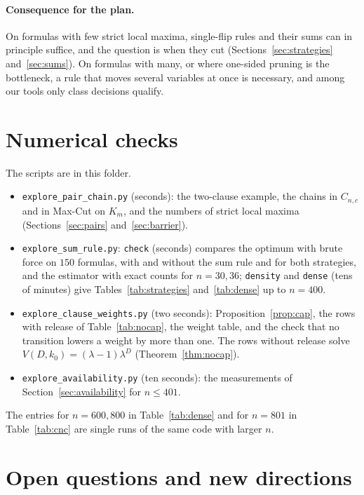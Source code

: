 \documentclass[11pt,a4paper]{article}
\theoremstyle{remark}
\begin{document}
\paragraph{Consequence for the plan.} On formulas with few strict local maxima,
single-flip rules and their sums can in principle suffice, and the question is
when they cut (Sections~\ref{sec:strategies} and~\ref{sec:sums}). On formulas
with many, or where one-sided pruning is the bottleneck, a rule that moves
several variables at once is necessary, and among our tools only class
decisions qualify.

\section{Numerical checks}\label{sec:numerics}

The scripts are in this folder.
\begin{itemize}
 \item \texttt{explore\_pair\_chain.py} (seconds): the two-clause example, the
 chains in $C_{n,c}$ and in Max-Cut on $K_m$, and the numbers of strict local
 maxima (Sections~\ref{sec:pairs} and~\ref{sec:barrier}).
 \item \texttt{explore\_sum\_rule.py}: \texttt{check} (seconds) compares the
 optimum with brute force on $150$ formulas, with and without the sum rule and
 for both strategies, and the estimator with exact counts for $n=30,36$;
 \texttt{density} and \texttt{dense} (tens of minutes) give
 Tables~\ref{tab:strategies} and~\ref{tab:dense} up to $n=400$.
 \item \texttt{explore\_clause\_weights.py} (two seconds):
 Proposition~\ref{prop:cap}, the rows with release of Table~\ref{tab:nocap},
 the weight table, and the check that no transition lowers a weight by more
 than one. The rows without release solve $V(D,k_0)=(\lambda-1)\lambda^D$
 (Theorem~\ref{thm:nocap}).
 \item \texttt{explore\_availability.py} (ten seconds): the measurements of
 Section~\ref{sec:availability} for $n\le401$.
\end{itemize}
The entries for $n=600,800$ in Table~\ref{tab:dense} and for $n=801$ in
Table~\ref{tab:cnc} are single runs of the same code with larger $n$.

\section{Open questions and new directions}\label{sec:open}
\end{document}
